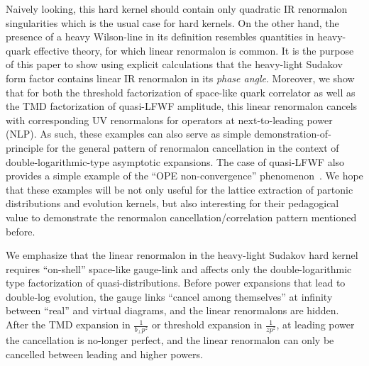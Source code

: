 \documentclass[a4paper,11pt]{article}
\begin{document}
Naively looking, this hard kernel should contain only quadratic IR renormalon singularities which is the usual case for hard kernels. On the other hand, the presence of a heavy Wilson-line in its definition resembles quantities in heavy-quark effective theory, for which linear renormalon is common. It is the purpose of this paper to show using explicit calculations that the heavy-light Sudakov form factor contains linear IR renormalon in its {\it phase angle}. Moreover, we show that for both the threshold factorization of space-like quark correlator as well as the TMD factorization of quasi-LFWF amplitude, this linear renormalon cancels with corresponding UV renormalons for operators at next-to-leading power (NLP). As such, these examples can also serve as simple demonstration-of-principle for the general pattern of renormalon cancellation in the context of double-logarithmic-type asymptotic expansions.  The case of quasi-LFWF also provides a simple example of the ``OPE non-convergence'' phenomenon~\cite{Shifman:1994yf,Shifman:1998rb}. We hope that these examples will be not only useful for the lattice extraction of partonic distributions and evolution kernels, but also interesting for their pedagogical value to demonstrate the renormalon cancellation/correlation pattern mentioned before. 

We emphasize that the linear renormalon in the heavy-light Sudakov hard kernel requires  ``on-shell'' space-like gauge-link and affects only the double-logarithmic type factorization of quasi-distributions.  Before power expansions that lead to double-log evolution, the gauge links ``cancel among themselves'' at infinity between ``real'' and virtual diagrams, and the linear renormalons are hidden. After the TMD expansion in $\frac{1}{b_{\perp} p^z}$ or threshold expansion in $\frac{1}{zp^z}$, at leading power the cancellation is no-longer perfect, and the linear renormalon can only be cancelled between leading and higher powers. 
\end{document}
